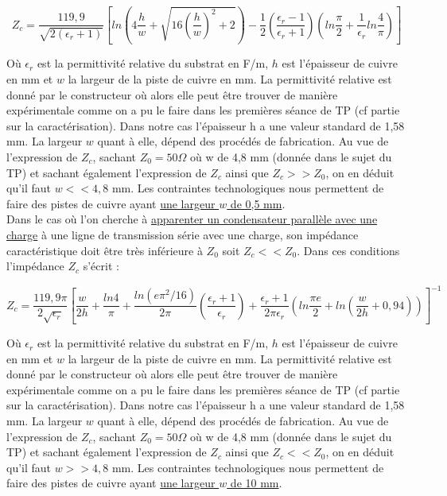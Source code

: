 \documentclass[french]{article}
\begin{document}
\begin{equation}
	Z_c = \frac{119,9}{\sqrt{2(\epsilon_r + 1)}} \left[ ln\left(4\frac{h}{w} + \sqrt{16\left(\frac{h}{w}\right)^2 + 2}\right) - \frac{1}{2}\left(\frac{\epsilon_r - 1}{\epsilon_r + 1}\right) \left(ln\frac{\pi}{2} + \frac{1}{\epsilon_r}ln\frac{4}{\pi}\right) \right]
	\label{eq:Z_c_bobine}
\end{equation}

Où $\epsilon_r$ est la permittivité relative du substrat en F/m, $h$ est l'épaisseur de cuivre en mm et $w$ la largeur de la piste de cuivre en mm. La permittivité relative est donné par le constructeur où alors elle peut être trouver de manière expérimentale comme on a pu le faire dans les premières séance de TP (cf partie sur la caractérisation). Dans notre cas l'épaisseur h a une valeur standard de 1,58 mm. La largeur $w$ quant à elle, dépend des procédés de fabrication. Au vue de l'expression de $Z_c$, sachant $Z_0=50 \Omega$ où w de 4,8 mm (donnée dans le sujet du TP) et sachant également l'expression de $Z_c$ ainsi que $Z_c >> Z_0$, on en déduit qu'il faut $w << 4,8$ mm. Les contraintes technologiques nous permettent de faire des pistes de cuivre ayant \underline{une largeur $w$ de 0,5 mm}.\\

Dans le cas où l'on cherche à \underline{apparenter un condensateur parallèle avec une charge} à une ligne de transmission série avec une charge, son impédance caractéristique doit être très inférieure à $Z_0$ soit $Z_c << Z_0$. Dans ces conditions l'impédance $Z_c$ s'écrit :

\begin{equation}
	Z_c= \frac{119,9\pi}{2\sqrt{\epsilon_r}}\left[\frac{w}{2h} + \frac{ln4}{\pi} + \frac{ln(e\pi^2 / 16)}{2\pi}\left(\frac{\epsilon_r + 1}{\epsilon_r}\right) + \frac{\epsilon_r + 1}{2\pi \epsilon_r} \left( ln\frac{\pi e}{2} +  ln\left(\frac{w}{2h} + 0,94 \right) \right)  \right]^{-1}
	\label{eq:Z_c_condo}
\end{equation}


Où $\epsilon_r$ est la permittivité relative du substrat en F/m, $h$ est l'épaisseur de cuivre en mm et $w$ la largeur de la piste de cuivre en mm. La permittivité relative est donné par le constructeur où alors elle peut être trouver de manière expérimentale comme on a pu le faire dans les premières séance de TP (cf partie sur la caractérisation). Dans notre cas l'épaisseur h a une valeur standard de 1,58 mm. La largeur $w$ quant à elle, dépend des procédés de fabrication. Au vue de l'expression de $Z_c$, sachant $Z_0=50 \Omega$ où w de 4,8 mm (donnée dans le sujet du TP) et sachant également l'expression de $Z_c$ ainsi que $Z_c << Z_0$, on en déduit qu'il faut $w >> 4,8$ mm. Les contraintes technologiques nous permettent de faire des pistes de cuivre ayant \underline{une largeur $w$ de 10 mm}.\\
\end{document}
